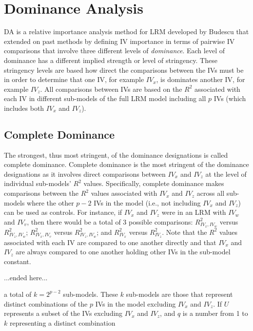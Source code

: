 \documentclass[ShortAfour,times,sageapa]{sagej}
\begin{document}
\section{Dominance Analysis}
	DA is a relative importance analysis method for LRM developed by Budescu \citeyear{budescu1993dominance} that extended on past methods by defining IV importance in terms of pairwise IV comparisons that involve three different levels of \emph{dominance}.
	Each level of dominance has a different implied strength or level of stringency. 
	These stringency levels are based how direct the comparisons between the IVs must be in order to determine that one IV, for example $IV_x$, is dominates another IV, for example $IV_z$.
	All comparisons between IVs are based on the $R^2$ associated with each IV in different sub-models of the full LRM model including all $p$ IVs (which includes both $IV_x$ and $IV_z$).
	
	\subsection{Complete Dominance}
	
	The strongest, thus most stringent, of the dominance designations is called complete dominance. 
	Complete dominance is the most stringent of the dominance designations as it involves direct comparisons between $IV_x$ and $IV_z$ at the level of individual sub-models' $R^2$ values.
	Specifically, complete dominance makes comparisons between the $R^2$ values associated with $IV_x$ and $IV_z$ across all sub-models where the other $p - 2$ IVs in the model (i.e., not including $IV_x$ and $IV_z$) can be used as controls.
	For instance, if $IV_x$ and $IV_z$ were in an LRM with $IV_w$ and $IV_v$, then there would be a total of 3 possible comparisons: $R^2_{IV_x, IV_w}$ versus $R^2_{IV_z, IV_w}$; $R^2_{IV_x, IV_v}$ versus $R^2_{IV_z, IV_w}$; and $R^2_{IV_x}$ versus $R^2_{IV_z}$.
	Note that the $R^2$ values associated with each IV are compared to one another directly and that $IV_x$ and $IV_z$ are always compared to one another holding other IVs in the sub-model constant.
	
	...ended here...
	
	
	
	a total of $k = 2^{p - 2}$ sub-models.
	These $k$ sub-models are those that represent distinct combinations of the $p$ IVs in the model excluding $IV_x$ and $IV_z$.
	If $U$ represents a subset of the IVs excluding $IV_x$ and $IV_z$, and $q$ is a number from 1 to $k$ representing a distinct combination
	
\end{document}
